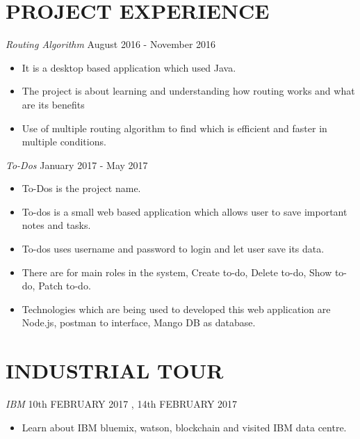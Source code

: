 \documentclass[margin, ]{res} %
\begin{document}
\begin{resume}
 
 
\section{PROJECT EXPERIENCE}

{\sl Routing Algorithm} \hfill August 2016 - November 2016 \\

\begin{itemize}
\item It is a desktop based application which used Java.
\item The project is about learning and understanding how routing works and what are its benefits 
\item Use of multiple routing algorithm to find which is efficient and faster in multiple conditions. 

\end{itemize} 
{\sl To-Dos} \hfill January 2017 - May 2017 \\
\begin{itemize}
\item To-Dos is the project name.
\item To-dos is a small web based application which allows user to save important notes and tasks.
\item To-dos uses username and password to login and let user save its data.
\item There are for main roles in the system, Create to-do, Delete to-do, Show to-do, Patch to-do.
\item Technologies which are being used to developed this web application are Node.js, postman to interface, Mango DB as database.
\end{itemize}

\section{INDUSTRIAL TOUR}

{\sl IBM} \hfill 10th FEBRUARY 2017 , 14th FEBRUARY 2017

\begin{itemize}
\item Learn about IBM bluemix, watson, blockchain and visited IBM data centre.
\end{itemize} 


\end{resume}
\end{document}
